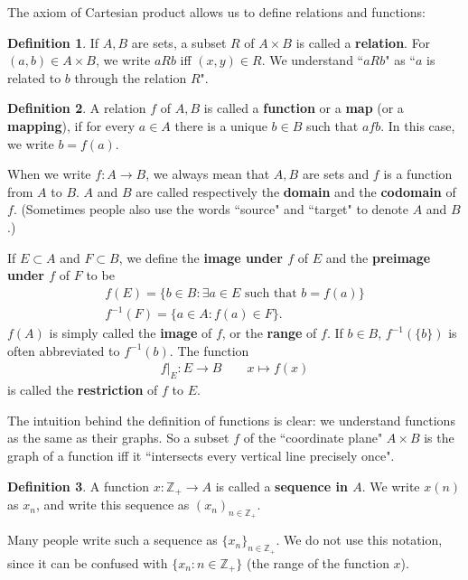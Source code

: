 \documentclass[12pt,b5paper,notitlepage]{article}
\theoremstyle{definition}
\newtheorem{df}{Definition}[section]
\theoremstyle{plain}
\newcommand{\Zbb}{\mathbb Z}
\numberwithin{equation}{section}
\begin{document}
The axiom of Cartesian product allows us to define relations and functions:

\begin{df}
If $A,B$ are sets, a subset $R$ of $A\times B$ is called a \textbf{relation}. For $(a,b)\in A\times B$, we write $aRb$ iff $(x,y)\in R$. We understand ``$aRb$" as ``$a$ is related to $b$ through the relation $R$".
\end{df}


\begin{df}
A relation $f$ of $A,B$ is called a \textbf{function} or a \textbf{map} (or a \textbf{mapping}), if for every $a\in A$ there is a unique $b\in B$ such that $afb$. In this case, we write $b=f(a)$.

When we write $f:A\rightarrow B$, we always mean that $A,B$ are sets and $f$ is a function from $A$ to $B$. $A$ and $B$ are called respectively the \textbf{domain} and the \textbf{codomain} of $f$. (Sometimes people also use the words ``source" and ``target" to denote $A$ and $B$.) 

If $E\subset A$ and $F\subset B$, we define the \textbf{image under $f$} of $E$  and the \textbf{preimage under $f$} of $F$ to be
\begin{gather*}
f(E)=\{b\in B:\exists a\in E\text{ such that }b=f(a)\}\\
f^{-1}(F)=\{a\in A: f(a)\in F\}.
\end{gather*}
$f(A)$ is simply called the \textbf{image} of $f$, or the \textbf{range} of $f$. If $b\in B$, $f^{-1}(\{b\})$ is often abbreviated to $f^{-1}(b)$. The function 
\begin{align*}
f|_E:E\rightarrow B\qquad x\mapsto f(x)
\end{align*}
is called the \textbf{restriction}  of $f$ to $E$. \hfill\qedsymbol
\end{df}

The intuition behind the definition of functions is clear: we understand functions as the same as their graphs. So a subset $f$ of the ``coordinate plane" $A\times B$ is the graph of a function iff it ``intersects every vertical line precisely once".


\begin{df}\label{lb13}
A function $x:\Zbb_+\rightarrow A$ is called a \textbf{sequence in $A$}. We write $x(n)$ as $x_n$, and write this sequence as $(x_n)_{n\in\Zbb_+}$.
\end{df}

Many people write such a sequence as $\{x_n\}_{n\in\Zbb_+}$. We do not use this notation, since it can be confused with $\{x_n: n\in\Zbb_+\}$ (the range of the function $x$).
\end{document}
